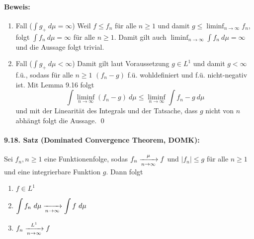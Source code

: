 \paragraph{Beweis:}
\begin{enumerate}[label=\Roman*.]
    \item Fall ($\int g_+\ d\mu=\infty$)\newline
    Weil $f\leq f_n$ f\"ur alle $n\geq1$ und damit $g\leq\liminf_{n\to\infty}f_n$, folgt $\int f_n\ d\mu=\infty$ f\"ur alle $n\geq1$. Damit gilt auch $\liminf_{n\to\infty}\int f_n\ d\mu=\infty$ und die Aussage folgt trivial.
    \item Fall ($\int g_+\ d\mu<\infty$)\newline
    Damit gilt laut Voraussetzung $g\in L^1$ und damit $g<\infty$ f.\"u., sodass f\"ur alle $n\geq1$ $(f_n-g)$ f.\"u. wohldefiniert und  f.\"u. nicht-negativ ist. Mit Lemma 9.16 folgt
    $$\int\liminf_{n\to\infty}(f_n-g)\ d\mu\leq\liminf_{n\to\infty}\int f_n-g\ d\mu$$
    und mit der Linearit\"at des Integrals und der Tatsache, dass $g$ nicht von $n$ abh\"angt folgt die Aussage. \qed
\end{enumerate}

\paragraph{9.18. Satz (Dominated Convergence Theorem, DOMK):} Sei $f_n,n\geq1$ eine Funktionenfolge, sodas $f_n\nto{\mu}{n\to\infty}f$ und $|f_n|\leq g$ f\"ur alle $n\geq1$ und eine integrierbare Funktion $g$. Dann folgt
\begin{enumerate}[label=(\roman*)]
    \item $f\in L^1$
    \item $\displaystyle\int f_n\ d\mu\nto{}{n\to\infty}\int f\ d\mu$
    \item $f_n\nto{L^1}{n\to\infty}f$
\end{enumerate}

